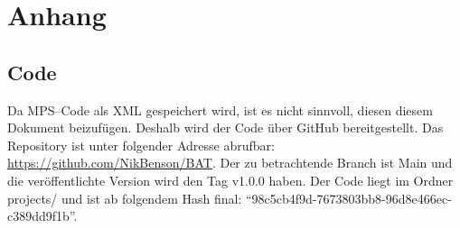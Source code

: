 \appendix


\section{Anhang}\label{sec:anhang}

\subsection{Code}\label{appendix:code}
Da \acs{MPS}--Code als \ac{XML} gespeichert wird, ist es nicht sinnvoll, diesen diesem Dokument beizufügen.
Deshalb wird der Code über GitHub bereitgestellt.
Das Repository ist unter folgender Adresse abrufbar: \href{https://github.com/NikBenson/BAT}{https://github.com/NikBenson/BAT}.
Der zu betrachtende Branch ist Main und die veröffentlichte Version wird den Tag {\ttfamily v1.0.0} haben.
Der Code liegt im Ordner {\ttfamily projects/} und ist ab folgendem Hash final: \enquote{98c5cb4f9d-7673803bb8-96d8e466ec-c389dd9f1b}.

